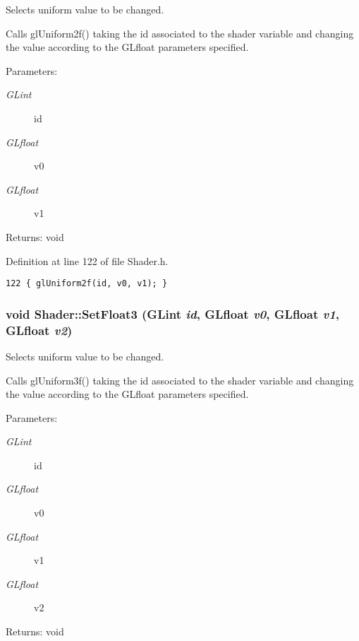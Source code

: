 Selects uniform value to be changed. 

Calls glUniform2f() taking the id associated to the shader variable and changing the value according to the GLfloat parameters specified.

\begin{Desc}
\item[Parameters:]
\begin{description}
\item[{\em GLint}]id \item[{\em GLfloat}]v0 \item[{\em GLfloat}]v1 \end{description}
\end{Desc}
\begin{Desc}
\item[Returns:]void \end{Desc}


Definition at line 122 of file Shader.h.

\begin{Code}\begin{verbatim}122 { glUniform2f(id, v0, v1); }
\end{verbatim}
\end{Code}


\hypertarget{class_shader_439aaf809ad7287862907ab1a36f3849}{
\subsubsection[SetFloat3]{\setlength{\rightskip}{0pt plus 5cm}void Shader::SetFloat3 (GLint {\em id}, \/  GLfloat {\em v0}, \/  GLfloat {\em v1}, \/  GLfloat {\em v2})}}
\label{class_shader_439aaf809ad7287862907ab1a36f3849}


Selects uniform value to be changed. 

Calls glUniform3f() taking the id associated to the shader variable and changing the value according to the GLfloat parameters specified.

\begin{Desc}
\item[Parameters:]
\begin{description}
\item[{\em GLint}]id \item[{\em GLfloat}]v0 \item[{\em GLfloat}]v1 \item[{\em GLfloat}]v2 \end{description}
\end{Desc}
\begin{Desc}
\item[Returns:]void \end{Desc}


